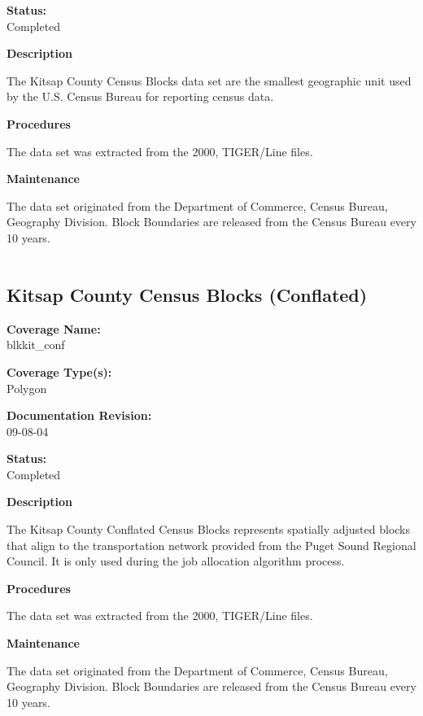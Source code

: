 {\bf \large Status:}\\
Completed

{\bf \large Description}

The Kitsap County Census Blocks data set are the smallest
geographic unit used by the U.S. Census Bureau for reporting
census data.

{\bf \large Procedures}

The data set was extracted from the 2000, TIGER/Line files.

{\bf \large Maintenance}

The data set originated from the Department of Commerce, Census
Bureau, Geography Division. Block Boundaries are released from the
Census Bureau every 10 years.

\begin{landscape}
\begin{longtable}{llrrrrrc}

\end{longtable}
\end{landscape}
\newpage

\subsection{Kitsap County Census Blocks (Conflated)}

{\bf \large Coverage Name:}\\
blkkit\_conf

{\bf \large Coverage Type(s):}\\
Polygon

{\bf \large Documentation Revision:}\\
09-08-04

{\bf \large Status:}\\
Completed

{\bf \large Description}

The Kitsap County Conflated Census Blocks represents spatially
adjusted blocks that align to the transportation network provided
from the Puget Sound Regional Council. It is only used during the
job allocation algorithm process.

{\bf \large Procedures}

The data set was extracted from the 2000, TIGER/Line files.

{\bf \large Maintenance}

The data set originated from the Department of Commerce, Census
Bureau, Geography Division. Block Boundaries are released from the
Census Bureau every 10 years.

